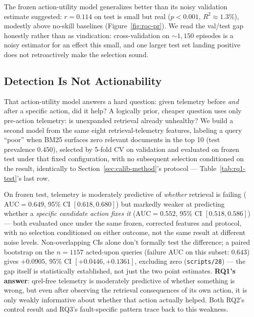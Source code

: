 \documentclass[conference]{IEEEtran}
\begin{document}
The frozen action-utility model generalizes better than its noisy
validation estimate suggested: $r=0.114$ on test is small but real
($p<0.001$, $R^2\approx1.3\%$), modestly above no-skill baselines
(Figure~\ref{fig:roc-pr}). We read the val/test gap honestly rather
than as vindication: cross-validation on $\sim\!1{,}150$ episodes is a
noisy estimator for an effect this small, and one larger test set
landing positive does not retroactively make the selection sound.

\subsection{Detection Is Not Actionability}
\label{sec:detect-vs-act}

That action-utility model answers a hard question: given telemetry
before \emph{and} after a specific action, did it help? A logically
prior, cheaper question uses only pre-action telemetry: is unexpanded
retrieval already unhealthy? We build a second model from the same
eight retrieval-telemetry features, labeling a query ``poor'' when
BM25 surfaces zero relevant documents in the top 10 (test prevalence
$0.450$), selected by 5-fold CV on validation and evaluated on frozen
test under that fixed configuration, with no subsequent selection
conditioned on the result, identically to
Section~\ref{sec:calib-method}'s protocol --- Table~\ref{tab:rq1-test}'s
last row.

On frozen test, telemetry is moderately predictive of
\emph{whether} retrieval is failing
($\text{AUC}=0.649$, 95\% CI $[0.618,0.680]$) but markedly weaker at
predicting whether a \emph{specific candidate action fixes it}
($\text{AUC}=0.552$, 95\% CI $[0.518,0.586]$) --- both evaluated once
under the same frozen, corrected features and protocol, with no
selection conditioned on either outcome, not the same result at
different noise levels. Non-overlapping CIs alone don't
formally test the difference; a paired bootstrap on the $n{=}1157$
acted-upon queries (failure AUC on this subset: $0.643$) gives
$+0.0905$, 95\% CI $[+0.0446,+0.1361]$, excluding zero
(\texttt{scripts/28}) --- the gap itself is statistically established,
not just the two point estimates. \textbf{RQ1's answer}: qrel-free
telemetry is moderately predictive of whether something is wrong, but
even after observing the retrieval consequences of its own action, it
is only weakly informative about whether that action actually helped.
Both RQ2's control result and RQ3's fault-specific pattern trace back
to this weakness.
\end{document}
